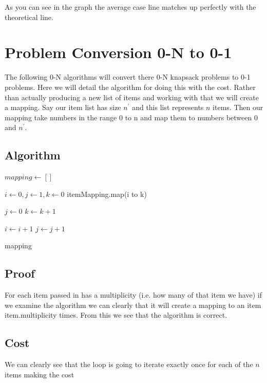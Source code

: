 \documentclass{article}
\begin{document}
			As you can see in the graph the average case line matches up perfectly with the theoretical line.
		
	\section{Problem Conversion 0-N to 0-1}
		The following 0-N algorithms will convert there 0-N knapsack problems to 0-1 problems. Here we will detail the algorithm for doing this with the cost. Rather than actually producing a new list of items and working with that we will create a mapping. Say our item list has size $n^\prime$ and this list represents $n$ items. Then our mapping take numbers in the range 0 to n and map them to numbers between 0 and $n^\prime$.
	
		\break	
				
		\subsection{Algorithm}
			\begin{algorithm}
				\begin{algorithmic}[1]
						\State $mapping \gets []$					
					
						\State $i \gets 0, j \gets 1, k \gets 0$
							\State itemMapping.map(i to k)
							
								\State $j \gets 0$
								\State $k \gets k + 1$
							\EndIf
							
							\State $i \gets i + 1$
							\State $j \gets j + 1$
						\EndWhile
						
						\Return mapping
					\EndProcedure
				\end{algorithmic}
			\end{algorithm}		
		\subsection{Proof}
			For each item passed in has a multiplicity (i.e. how many of that item we have) if we examine the algorithm we can clearly that it will create a mapping to an item item.multiplicity times. From this we see that the algorithm is correct.
			
		\subsection{Cost}
			We can clearly see that the loop is going to iterate exactly once for each of the $n$ items making the cost
			
\end{document}
